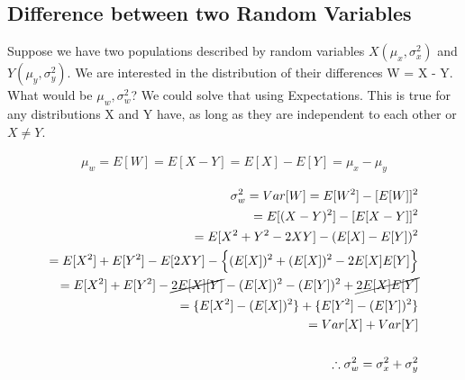 \documentclass[tikz = true, float=false, crop=false, 11pt]{standalone}
\begin{document}
	
\ifstandalone
\tableofcontents %
\newpage
\fi


\subsection{Difference between two Random Variables} \label{app_sc:001} 

	Suppose we have two populations described by random variables $X(\mu_x, \sigma_x^2)$ and $Y(\mu_y, \sigma_y^2)$. We are interested in 	the distribution of their differences W = X - Y. What would be $\mu_w,\sigma_w^2$? We could solve that using Expectations. This is true for any distributions X and Y have, as long as they are independent to each other or $X \neq Y$. 
	
	\begin{align}
	\mu_w = E[W] = E[X - Y] = E[X] - E[Y] = \mu_x - \mu_y 
	\end{align}

	\begin{align}		
	\sigma_w^2 = Var[W] = E[W^2] - [E[W]]^2 \nonumber \\
	= E[(X-Y)^2] - [E[X-Y]]^2 \nonumber \\
	= E[X^2 + Y^2 - 2XY] - (E[X] - E[Y])^2 \nonumber \\
	= E[X^2] + E[Y^2] - E[2XY] - \Big\{  (E[X])^2 + (E[X])^2 - 2E[X]E[Y]  \Big\} \nonumber \\
	= E[X^2] + E[Y^2] - \cancel{2E[X][Y]} - (E[X])^2 - (E[Y])^2 + \cancel{2E[X]E[Y]} \nonumber \\
	= \{E[X^2] - (E[X])^2\} + \{E[Y^2] - (E[Y])^2\} \nonumber \\
	= Var[X] + Var[Y] \nonumber \\ \nonumber \\
	\therefore \sigma_w^2 = \sigma_x^2 + \sigma_y^2 
	\end{align}
\end{document}
